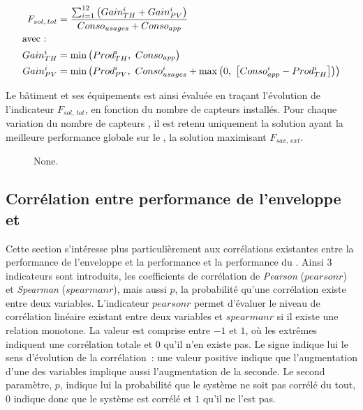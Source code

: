 \begin{align}\label{eq:f_sol_mensuel_total}
        F_{sol,\, tot} &= \frac{\sum_{i=1}^{12}\left(Gain_{TH}^{i} + Gain_{PV}^{i} \right)}{Conso_{usages} + Conso_{app}} \\
        \shortintertext{avec~:}
        Gain_{TH}^{i} &= \min \left(Prod_{TH}^{i},\ Conso_{app} \right) \\
        Gain_{PV}^{i} &= \min \left(Prod_{PV}^{i},\ Conso_{usages}^{i} + \max\left(0,\ \left[Conso_{app}^{i} - Prod_{TH}^{i} \right]\right) \right) \\
\end{align}

Le bâtiment et ses équipements est ainsi évaluée en traçant l’évolution de l’indicateur $F_{sol,\, tot}$,
en fonction du nombre de capteurs  installés. Pour chaque variation du nombre de capteurs ,
il est retenu uniquement la solution ayant la meilleure performance globale sur le , la solution
maximisant $F_{sav,\,ext}$.

\begin{figure}
    \centering
    \caption[None]
             {None.}
    \label{fig:fsoltot_vs_pvnumber}
\end{figure}



\subsection{Corrélation entre performance de l’enveloppe et } %
\label{sub:correlation_entre_performance_de_l_enveloppe_et_ssc}
Cette section s’intéresse plus particulièrement aux corrélations existantes entre la
performance de l’enveloppe et la performance et la performance du . Ainsi $3$
indicateurs sont introduits, les coefficients de corrélation de \textit{Pearson}
($pearsonr$) et \textit{Spearman} ($spearmanr$), mais aussi $p$, la probabilité qu’une
corrélation existe entre deux variables. L’indicateur $pearsonr$ permet d’évaluer le niveau de
corrélation linéaire existant entre deux variables et $spearmanr$ si il existe une
relation monotone. La valeur est comprise entre $-1$ et $1$, où les extrêmes indiquent
une corrélation totale et $0$ qu’il n’en existe pas. Le signe indique lui le sens
d’évolution de la corrélation~: une valeur positive indique que l’augmentation
d’une des variables implique aussi l’augmentation de la seconde. Le second paramètre, $p$, indique
lui la probabilité que le système ne soit pas corrélé du tout, $0$ indique donc que le système
est corrélé et $1$ qu’il ne l’est pas.

